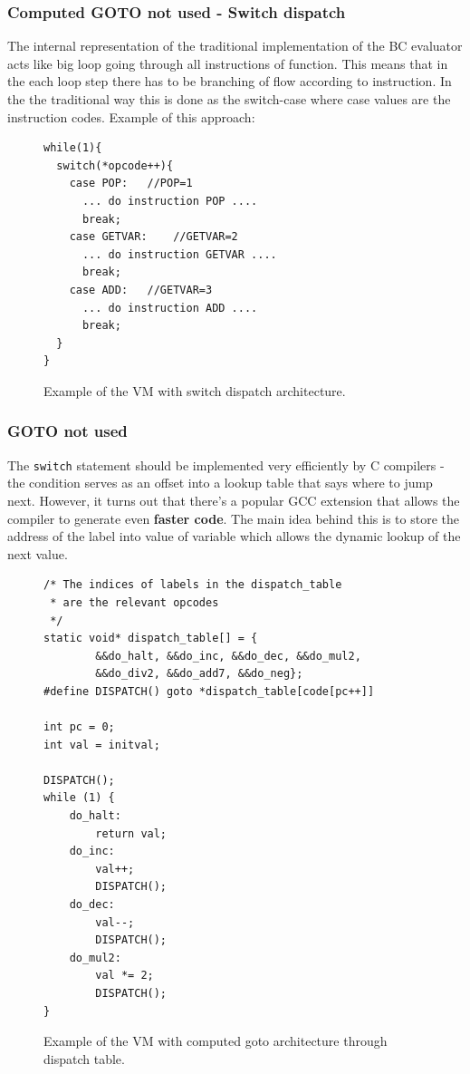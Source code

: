 \documentclass[thesis=M,english]{FITthesis}[2018/10/20]
\newcommand{\code}[1]{\texttt{#1}}
\begin{document}
\subsubsection{Computed GOTO not used - Switch dispatch}

The internal representation of the traditional implementation of the BC evaluator acts like big loop going through all instructions of function. This means that in the each loop step there has to be branching of flow according to instruction. In the the traditional way this is done as the switch-case where case values are the instruction codes. Example of this approach:

\begin{figure}[!htb]
\begin{lstlisting}
while(1){
  switch(*opcode++){
    case POP:	//POP=1
      ... do instruction POP ....
      break;
    case GETVAR:	//GETVAR=2
      ... do instruction GETVAR ....
      break;
    case ADD:	//GETVAR=3
      ... do instruction ADD ....
      break;
  }
}
\end{lstlisting}
\caption{\label{fig:goto-not-used} Example of the VM with switch dispatch architecture.}
\end{figure}

\subsubsection{GOTO not used}

The \code{switch} statement should be implemented very efficiently by C compilers - the condition serves as an offset into a lookup table that says where to jump next. However, it turns out that there's a popular GCC extension that allows the compiler to generate even \textbf{faster code}. The main idea behind this is to store the address of the label into value of variable which allows the dynamic lookup of the next value.

\begin{figure}[!htb]
\begin{lstlisting}
/* The indices of labels in the dispatch_table 
 * are the relevant opcodes
 */
static void* dispatch_table[] = {
        &&do_halt, &&do_inc, &&do_dec, &&do_mul2,
        &&do_div2, &&do_add7, &&do_neg};
#define DISPATCH() goto *dispatch_table[code[pc++]]

int pc = 0;
int val = initval;

DISPATCH();
while (1) {
    do_halt:
        return val;
    do_inc:
        val++;
        DISPATCH();
    do_dec:
        val--;
        DISPATCH();
    do_mul2:
        val *= 2;
        DISPATCH();
}
\end{lstlisting}
\caption{\label{fig:goto-used-table} Example of the VM with computed goto architecture through dispatch table.}
\end{figure}
\end{document}
